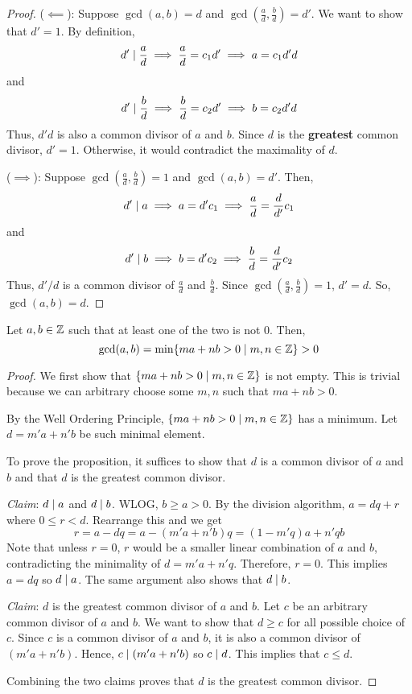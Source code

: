 \begin{proof}
    \hfill

    ($\impliedby$): Suppose $\gcd(a,b) = d$ and $\gcd(\frac{a}{d}, \frac{b}{d}) = d'$. We want to show that $d' = 1$. By definition,
    $$
    d' \mathrel{\mid} \frac{a}{d} \implies \frac{a}{d} = c_1 d' \implies a = c_1d'd
    $$
    and
    $$
    d' \mathrel{\mid} \frac{b}{d} \implies \frac{b}{d} = c_2 d' \implies b = c_2d'd
    $$
    Thus, $d'd$ is also a common divisor of $a$ and $b$. Since $d$ is the \textbf{greatest} common divisor, $d' = 1$. Otherwise, it would contradict the maximality of $d$.

    ($\implies$): Suppose $\gcd(\frac{a}{d},\frac{b}{d}) = 1$ and $\gcd(a,b) = d'$. Then,
    $$
    d' \mathrel{\mid} a \implies a = d' c_1 \implies \frac{a}{d} = \frac{d}{d'} c_1
    $$
    and
    $$
    d' \mathrel{\mid} b \implies b = d' c_2 \implies \frac{b}{d} = \frac{d}{d'} c_2
    $$
    Thus, $d'/d$ is a common divisor of $\frac{a}{d}$ and $\frac{b}{d}$. Since $\gcd(\frac{a}{d}, \frac{b}{d}) = 1$, $d' = d$. So, $\gcd(a,b) = d$.
\end{proof}

\begin{proposition} \label{prop:gcd-linear-combination}
    Let $a,b \in \mathbb{Z}$ such that at least one of the two is not 0. Then,
    $$
    \gcd(a,b) = \min\{ma+nb > 0 \mid m,n \in \mathbb{Z}\} > 0
    $$
\end{proposition}

\begin{proof}
    We first show that $\{ma+nb > 0 \mid m,n \in \mathbb{Z}\}$ is not empty. This is trivial because we can arbitrary choose some $m,n$ such that $ma+nb > 0$.

    By the Well Ordering Principle, $\{ma+nb > 0 \mid m,n \in \mathbb{Z}\}$ has a minimum. Let $d = m'a + n'b$ be such minimal element.

    To prove the proposition, it suffices to show that $d$ is a common divisor of $a$ and $b$ and that $d$ is the greatest common divisor.

    \textit{Claim}: $d \mathrel{\mid} a$ and $d \mathrel{\mid} b$. WLOG, $b \geq a > 0$. By the division algorithm, $a = dq + r$ where $0 \leq r < d$. Rearrange this and we get
    $$
    r = a - dq = a - (m'a + n'b) q = (1 - m'q) a + n'q b
    $$
    Note that unless $r = 0$, $r$ would be a smaller linear combination of $a$ and $b$, contradicting the minimality of $d = m'a + n'q$. Therefore, $r = 0$. This implies $a = dq$ so $d \mathrel{\mid} a$. The same argument also shows that $d \mathrel{\mid} b$.

    \textit{Claim}: $d$ is the greatest common divisor of $a$ and $b$. Let $c$ be an arbitrary common divisor of $a$ and $b$. We want to show that $d \geq c$ for all possible choice of $c$. Since $c$ is a common divisor of $a$ and $b$, it is also a common divisor of $(m'a+n'b)$. Hence, $c \mathrel{\mid} (m'a + n'b)$ so $c \mathrel{\mid} d$. This implies that $c \leq d$.

    Combining the two claims proves that $d$ is the greatest common divisor.
\end{proof}

